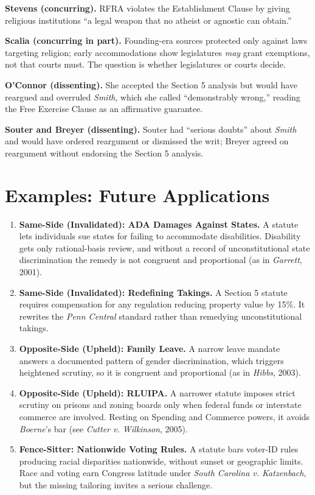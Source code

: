 \documentclass[12pt]{article}
\begin{document}
\textbf{Stevens (concurring).} RFRA violates the Establishment Clause by giving religious institutions ``a legal weapon that no atheist or agnostic can obtain.''

\textbf{Scalia (concurring in part).} Founding-era sources protected only against laws targeting religion; early accommodations show legislatures \textit{may} grant exemptions, not that courts must. The question is whether legislatures or courts decide.

\textbf{O'Connor (dissenting).} She accepted the Section 5 analysis but would have reargued and overruled \textit{Smith}, which she called ``demonstrably wrong,'' reading the Free Exercise Clause as an affirmative guarantee.

\textbf{Souter and Breyer (dissenting).} Souter had ``serious doubts'' about \textit{Smith} and would have ordered reargument or dismissed the writ; Breyer agreed on reargument without endorsing the Section 5 analysis.

\section{Examples: Future Applications}

\begin{enumerate}
\item \textbf{Same-Side (Invalidated): ADA Damages Against States.} A statute lets individuals sue states for failing to accommodate disabilities. Disability gets only rational-basis review, and without a record of unconstitutional state discrimination the remedy is not congruent and proportional (as in \textit{Garrett}, 2001).
\item \textbf{Same-Side (Invalidated): Redefining Takings.} A Section 5 statute requires compensation for any regulation reducing property value by 15\%. It rewrites the \textit{Penn Central} standard rather than remedying unconstitutional takings.
\item \textbf{Opposite-Side (Upheld): Family Leave.} A narrow leave mandate answers a documented pattern of gender discrimination, which triggers heightened scrutiny, so it is congruent and proportional (as in \textit{Hibbs}, 2003).
\item \textbf{Opposite-Side (Upheld): RLUIPA.} A narrower statute imposes strict scrutiny on prisons and zoning boards only when federal funds or interstate commerce are involved. Resting on Spending and Commerce powers, it avoids \textit{Boerne}'s bar (see \textit{Cutter v. Wilkinson}, 2005).
\item \textbf{Fence-Sitter: Nationwide Voting Rules.} A statute bars voter-ID rules producing racial disparities nationwide, without sunset or geographic limits. Race and voting earn Congress latitude under \textit{South Carolina v. Katzenbach}, but the missing tailoring invites a serious challenge.
\end{enumerate}
\end{document}
